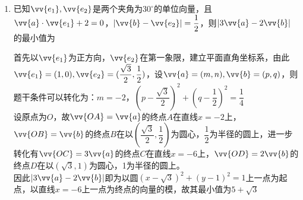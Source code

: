 \begin{enumerate}
\begin{enumerate}
        \begin{jieda}
            设$\triangle ABC$外接圆圆心为$O$，以$\vv{OA}$的方向为$x$轴正方向，设$A(2, 0)$, $B(-1, \sqrt{3})$, $C(-1, -\sqrt{3})$，建立平面直角坐标系。设$P(2cos\theta, 2sin\theta)$，由此\\
            $\vv{PA} = (2-2cos\theta, -2sin\theta), \vv{PB} = (-1-2cos\theta, \sqrt{3}-2sin\theta), \\
            \vv{PC} = (-1-2cos\theta, -\sqrt{3}-2sin\theta), \vv{PB} + \vv{PC} = (-2-4cos\theta, -4sin\theta)$，\\
            故$\vv{PA} \cdot \vv{PB} + \vv{PA} \cdot \vv{PC} = \vv{PA} \cdot (\vv{PB}+\vv{PC}) = (2-2cos\theta) \cdot (-2-4cos\theta) + (-2sin\theta) \cdot (-4sin\theta) = -4 - 4cos\theta + 8cos^2\theta + 8sin^2\theta = 4 - 4cos\theta \in [0, 8]$
        \end{jieda}
        
        \item 已知$\vv{e_1}, \vv{e_2}$是两个夹角为$30^{\circ}$的单位向量，且$\vv{a} \cdot \vv{e_1} + 2 = 0$，$|\vv{b} - \vv{e_2}| = \dfrac{1}{2}$，则$|3\vv{a} - 2\vv{b}|$的最小值为
        \begin{jieda}
            首先以$\vv{e_1}$为正方向，$\vv{e_2}$在第一象限，建立平面直角坐标系，由此$\vv{e_1} = (1, 0), \vv{e_2} = (\dfrac{\sqrt{3}}{2}, \dfrac{1}{2})$，设$\vv{a} = (m, n), \vv{b} = (p, q)$，则题干条件可以转化为：$m = -2$，$(p-\dfrac{\sqrt{3}}{2})^2+(q-\dfrac{1}{2})^2 = \dfrac{1}{4}$ \\
            设原点为$O$，故$\vv{OA} = \vv{a}$的终点$A$在直线$x = -2$上，$\vv{OB} = \vv{b}$的终点$B$在以$(\dfrac{\sqrt{3}}{2}, \dfrac{1}{2})$为圆心，$\dfrac{1}{2}$为半径的圆上，进一步转化有$\vv{OC} = 3\vv{a}$的终点$C$在直线$x = -6$上，$\vv{OD} = 2\vv{b}$的终点$D$在以$(\sqrt{3}, 1)$为圆心，1为半径的圆上。\\
            因此$|3\vv{a} - 2\vv{b}|$即为以圆$(x-\sqrt{3})^2+(y-1)^2 = 1$上一点为起点，以直线$x = -6$上一点为终点的向量的模，故其最小值为$5+\sqrt{3}$
        \end{jieda} 


\end{enumerate}
\end{enumerate}
